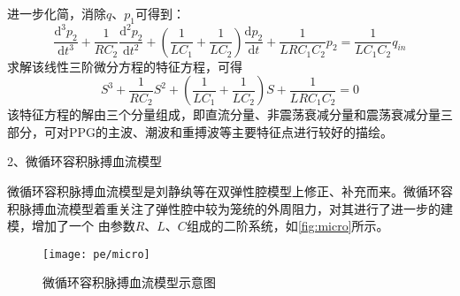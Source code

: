 进一步化简，消除$q$、$p_{1}$可得到：
\begin{equation}
    \label{equ:diff}
    \frac{\mathrm{d^3} p_{2}}{\mathrm{d} t^3}+\frac{1}{RC_{2}}\frac{\mathrm{d}^2p_{2} }{\mathrm{d} t^2}+
    (\frac{1}{LC_{1}}+\frac{1}{LC_{2}})\frac{\mathrm{d} p_{2}}{\mathrm{d} t}+\frac{1}{LRC_{1}C_{2}}p_{2}
    =\frac{1}{LC_{1}C_{2}}q_{in}
\end{equation}
求解该线性三阶微分方程的特征方程，可得
\begin{equation}
    \label{equ:character}
    S^3+\frac{1}{RC_{2}}S^2+(\frac{1}{LC_{1}}+\frac{1}{LC_{2}})S+\frac{1}{LRC_{1}C_{2}}=0
\end{equation}
该特征方程的解由三个分量组成，即直流分量、非震荡衰减分量和震荡衰减分量三部分，可对PPG的主波、潮波和重搏波等主要特征点进行较好的描绘。

2、微循环容积脉搏血流模型

微循环容积脉搏血流模型是刘静纨等\cite{Liu2001}在双弹性腔模型上修正、补充而来。微循环容积脉搏血流模型着重关注了弹性腔中较为笼统的外周阻力，对其进行了进一步的建模，增加了一个
由参数$R$、$L$、$C$组成的二阶系统，如\autoref{fig:micro}所示。
\begin{figure}[htbp]
    \centering
    \texttt{[image: pe/micro]}
    \caption[微循环容积脉搏血流模型示意图]{\label{fig:micro}微循环容积脉搏血流模型示意图\cite{PPGYY}}
\end{figure}

